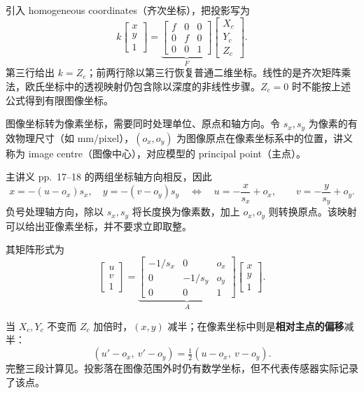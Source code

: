 引入 homogeneous coordinates（齐次坐标），把投影写为
\[
  k\begin{bmatrix}x\\y\\1\end{bmatrix}
  =\underbrace{\begin{bmatrix}f&0&0\\0&f&0\\0&0&1\end{bmatrix}}_{F}
   \begin{bmatrix}X_c\\Y_c\\Z_c\end{bmatrix}.
\]
第三行给出 $k=Z_c$；前两行除以第三行恢复普通二维坐标。线性的是齐次矩阵乘法，欧氏坐标中的透视映射仍包含除以深度的非线性步骤。$Z_c=0$ 时不能按上述公式得到有限图像坐标。


图像坐标转为像素坐标，需要同时处理单位、原点和轴方向。令 $s_x,s_y$ 为像素的有效物理尺寸（如 mm/pixel），$(o_x,o_y)$ 为图像原点在像素坐标系中的位置，讲义称为 image centre（图像中心），对应模型的 principal point（主点）。

\begin{center}

\end{center}

主讲义 pp.~17--18 的两组坐标轴方向相反，因此
\[
  x=-(u-o_x)s_x,\quad y=-(v-o_y)s_y
  \quad\Longleftrightarrow\quad
  \boxed{u=-\frac{x}{s_x}+o_x,\qquad v=-\frac{y}{s_y}+o_y}.
\]
负号处理轴方向，除以 $s_x,s_y$ 将长度换为像素数，加上 $o_x,o_y$ 则转换原点。该映射可以给出亚像素坐标，并不要求立即取整。

其矩阵形式为
\[
  \begin{bmatrix}u\\v\\1\end{bmatrix}
  =\underbrace{\begin{bmatrix}-1/s_x&0&o_x\\0&-1/s_y&o_y\\0&0&1\end{bmatrix}}_{A}
   \begin{bmatrix}x\\y\\1\end{bmatrix}.
\]

当 $X_c,Y_c$ 不变而 $Z_c$ 加倍时，$(x,y)$ 减半；在像素坐标中则是\textbf{相对主点的偏移}减半：
\[
  (u'-o_x,\ v'-o_y)=\tfrac12(u-o_x,\ v-o_y).
\]
完整三段计算见。投影落在图像范围外时仍有数学坐标，但不代表传感器实际记录了该点。

